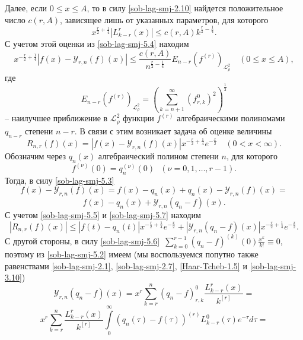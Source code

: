 Далее, если $0\le x\le A$, то в силу \eqref{sob-lag-smj-2.10} найдется положительное число $c(r,A)$, зависящее лишь от указанных параметров, для которого
$$
x^{\frac r2+\frac14}|L_{k-r}^{r}(x)|\le c(r,A)k^{\frac r2-\frac14}.
$$
С учетом этой оценки из \eqref{sob-lag-smj-5.4} находим
$$
x^{-\frac r2+\frac14}|f(x)-\mathcal{Y}_{r,n}(f)(x)|\le \frac{c(r,A)}{n^{\frac r2-\frac14}}E_{n-r}(f^{(r)})_{\mathcal{L}^2_\rho}\quad (0\le x\le A),
$$
где
$$
E_{n-r}(f^{(r)})_{\mathcal{L}^2_\rho}=\left(\sum_{k=n+1}^\infty  (f_{r,k}^0)^2\right)^\frac12
$$
-- наилучшее приближение в $\mathcal{L}^2_\rho$ функции $f^{(r)}$ алгебраическими полиномами $q_{n-r}$ степени $n-r$.  В связи с этим возникает задача об оценке  величины
\begin{equation}\label{sob-lag-smj-5.5}
  R_{n,r}(f)(x)=|f(x)-\mathcal{Y}_{r,n}(f)(x)|x^{-\frac r2+\frac14}e^{-\frac x2}\quad (0<x<\infty).
\end{equation}
Обозначим через $q_n(x)$ алгебраический полином степени $n$, для которого
\begin{equation}\label{sob-lag-smj-5.6}
  f^{(\nu)}(0)=q_n^{(\nu)}(0)\text{ }(\nu=0,1,\ldots,r-1).
\end{equation}
Тогда, в силу \eqref{sob-lag-smj-5.3}
\begin{equation*}
  f(x)-\mathcal{Y}_{r,n}(f)(x)=f(x)-q_n(x)+q_n(x)-\mathcal{Y}_{r,n}(f)(x)=
\end{equation*}
\begin{equation}\label{sob-lag-smj-5.7}
  f(x)-q_n(x)+\mathcal{Y}_{r,n}(q_n-f)(x).
\end{equation}
С учетом \eqref{sob-lag-smj-5.5} и \eqref{sob-lag-smj-5.7} находим
\begin{equation}\label{sob-lag-smj-5.8}
  |R_{n,r}(f)(x)|\le|f(t)-q_n(t)|x^{-\frac r2+\frac14}e^{-\frac x2}+|\mathcal{Y}_{r,n}(q_n-f)(x)|x^{-\frac r2+\frac14}e^{-\frac x2}.
\end{equation}
С другой стороны, в силу \eqref{sob-lag-smj-5.6}\, $\sum_{k=0}^{r-1} (q_n-f)^{(k)}(0)\frac{x^k}{k!}\equiv0$, поэтому из \eqref{sob-lag-smj-5.2}  имеем (мы воспользуемся попутно также равенствами \eqref{sob-lag-smj-2.1}, \eqref{sob-lag-smj-2.7}, \eqref{Haar-Tcheb-1.5} и \eqref{sob-lag-smj-3.10})
\begin{equation*}
  \mathcal{Y}_{r,n}(q_n-f)(x)=x^r\sum\limits_{k=r}^{n}({q_n-f})_{r,k}^0\frac{L_{k-r}^{r}(x)}{k^{[r]}}=
\end{equation*}
\begin{equation*}
  x^r\sum\limits_{k=r}^{n}\frac{L_{k-r}^{r}(x)}{k^{[r]}}\int\limits_0^\infty
  (q_n(\tau)-f(\tau))^{(r)}L_{k-r}^0(\tau)  e^{-\tau}d\tau=
\end{equation*}

